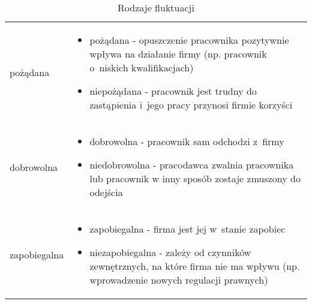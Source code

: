 \noindent\begin{minipage}{\textwidth}
             \begin{table}[H]
                 \raggedright\caption{Rodzaje fluktuacji\label{tabela:fluktuacja-rodzaje}}
                 \begin{center}
                     \begin{tabular}{|P{.15\textwidth}|P{.75\textwidth}|}

                         \hline
                          &
                          \\
                         \hline

                         pożądana &
                         \begin{itemize}
                             \item pożądana - opuszczenie pracownika pozytywnie wpływa na działanie firmy (np. pracownik o~niskich kwalifikacjach)
                             \item niepożądana - pracownik jest trudny do zastąpienia i~jego pracy przynosi firmie korzyści
                         \end{itemize} \\
                         \hline

                         dobrowolna &
                         \begin{itemize}
                             \item dobrowolna - pracownik sam odchodzi z~firmy
                             \item niedobrowolna - pracodawca zwalnia pracownika lub pracownik w inny sposób zostaje zmuszony do odejścia
                         \end{itemize}\\
                         \hline

                         zapobiegalna &
                         \begin{itemize}
                             \item zapobiegalna - firma jest jej w~stanie zapobiec
                             \item niezapobiegalna - zależy od czynników zewnętrznych, na które firma nie ma wpływu (np. wprowadzenie nowych regulacji prawnych)
                         \end{itemize}\\
                         \hline


\end{tabular}
\end{center}
\end{table}
\end{minipage}
